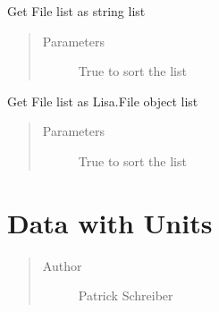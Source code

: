 \documentclass[letterpaper,10pt,openany,oneside,english]{sphinxmanual}
\begin{document}
\begin{fulllineitems}

\begin{fulllineitems}
\label{\detokenize{file:file.MultiFile.strlst}}
Get File list as string list
\begin{quote}\begin{description}
\item[{Parameters}] \leavevmode
{} \textendash{} True to sort the list

\end{description}\end{quote}

\end{fulllineitems}


\begin{fulllineitems}
\label{\detokenize{file:file.MultiFile.objlst}}
Get File list as Lisa.File object list
\begin{quote}\begin{description}
\item[{Parameters}] \leavevmode
{} \textendash{} True to sort the list

\end{description}\end{quote}

\end{fulllineitems}


\end{fulllineitems}

\label{\detokenize{data:module-data}}

\chapter{Data with Units}
\label{\detokenize{data::doc}}\label{\detokenize{data:data-with-units}}\label{\detokenize{data:data}}\begin{quote}\begin{description}
\item[{Author}] \leavevmode
Patrick Schreiber

\end{description}\end{quote}
\end{document}
